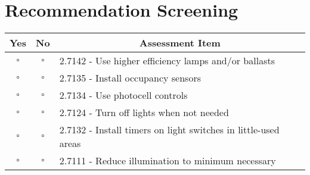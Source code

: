 \documentclass[./main.tex]{subfiles}
\begin{document}
\vspace{4cm}

\section*{Recommendation Screening}
\begin{tabular}{|c|c|p{13.5cm}|}
\hline
\multicolumn{1}{|c|}{\textbf{Yes}} & \multicolumn{1}{c|}{\textbf{No}} & \multicolumn{1}{c|}{\textbf{Assessment Item}} \\
\hline
$\square$ & $\square$ & 2.7142 - Use higher efficiency lamps and/or ballasts \\ \hline
$\square$ & $\square$ & 2.7135 - Install occupancy sensors \\ \hline
$\square$ & $\square$ & 2.7134 - Use photocell controls \\ \hline
$\square$ & $\square$ & 2.7124 - Turn off lights when not needed \\ \hline
$\square$ & $\square$ & 2.7132 - Install timers on light switches in little-used areas \\ \hline
$\square$ & $\square$ & 2.7111 - Reduce illumination to minimum necessary \\ \hline
\end{tabular}

\vspace{1cm}


\end{document}
